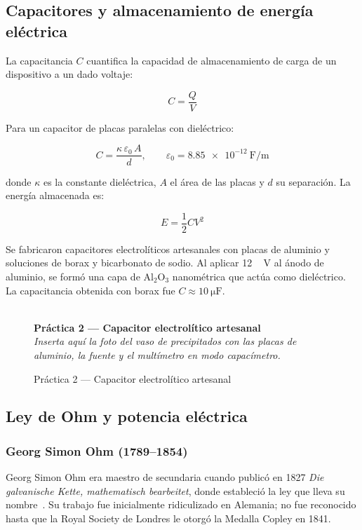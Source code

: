 \documentclass[12pt, a4paper]{article}
\newcommand{\figplaceholder}[2]{%
  \begin{figure}[H]
    \centering
    \begin{tcolorbox}[
      colback=white, colframe=gray!40,
      width=0.9\linewidth,
      halign=center, valign=center,
      height=4.5cm,
      enhanced, sharp corners,
      borderline={0.5pt}{0pt}{gray!40, dashed}
    ]
      \centering
      \textcolor{gray!60}{\Large } \\[4pt]
      \textbf{\textcolor{gray!70}{#1}} \\[2pt]
      \textit{\small\textcolor{gray!60}{#2}}
    \end{tcolorbox}
    \caption{#1}
    \label{fig:#1}
  \end{figure}%
}
\newcommand{\V}{\,\si{\volt}}
\begin{document}
\subsection{Capacitores y almacenamiento de energía eléctrica}

La capacitancia $C$ cuantifica la capacidad de almacenamiento de carga de
un dispositivo a un dado voltaje:

\begin{equation}
  C = \frac{Q}{V}
  \label{eq:cap_def}
\end{equation}

Para un capacitor de placas paralelas con dieléctrico:

\begin{equation}
  C = \frac{\kappa \,\varepsilon_0\, A}{d}, \qquad
  \varepsilon_0 = \SI{8.85e-12}{\farad\per\metre}
  \label{eq:cap_placas}
\end{equation}

donde $\kappa$ es la constante dieléctrica, $A$ el área de las placas y
$d$ su separación. La energía almacenada es:

\begin{equation}
  E = \frac{1}{2}CV^2
  \label{eq:energia_cap}
\end{equation}

\begin{cajaclas}
Se fabricaron capacitores electrolíticos artesanales con placas de aluminio
y soluciones de borax y bicarbonato de sodio. Al aplicar \SI{12}{\V} al
ánodo de aluminio, se formó una capa de Al$_2$O$_3$ nanométrica que actúa
como dieléctrico. La capacitancia obtenida con borax fue
$C \approx \SI{10}{\micro\farad}$.
\end{cajaclas}

\figplaceholder{Práctica 2 --- Capacitor electrolítico artesanal}
{Inserta aquí la foto del vaso de precipitados con las placas de aluminio, la fuente y el multímetro en modo capacímetro.}

\subsection{Ley de Ohm y potencia eléctrica}

\subsubsection{Georg Simon Ohm (1789--1854)}

Georg Simon Ohm era maestro de secundaria cuando publicó en 1827 \emph{Die
galvanische Kette, mathematisch bearbeitet}, donde estableció la ley que
lleva su nombre~\cite{ohm1827}. Su trabajo fue inicialmente ridiculizado en
Alemania; no fue reconocido hasta que la Royal Society de Londres le
otorgó la Medalla Copley en 1841.
\end{document}
